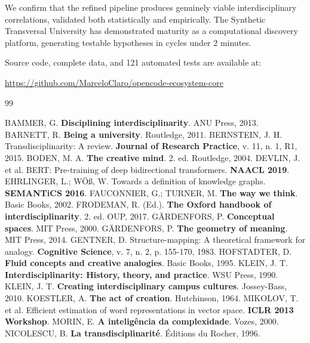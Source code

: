 \documentclass[a4paper,12pt]{article}
\begin{document}
We confirm that the refined pipeline produces genuinely viable interdisciplinary 
correlations, validated both statistically and empirically. The Synthetic Transversal 
University has demonstrated maturity as a computational discovery platform, generating 
testable hypotheses in cycles under 2 minutes.

Source code, complete data, and 121 automated tests are available at:
\begin{center}
\url{https://github.com/MarceloClaro/opencode-ecosystem-core}
\end{center}


\begin{thebibliography}{99}

 BAMMER, G. \textbf{Disciplining interdisciplinarity}. ANU Press, 2013.
 BARNETT, R. \textbf{Being a university}. Routledge, 2011.
 BERNSTEIN, J. H. Transdisciplinarity: A review. \textbf{Journal of Research Practice}, v. 11, n. 1, R1, 2015.
 BODEN, M. A. \textbf{The creative mind}. 2. ed. Routledge, 2004.
 DEVLIN, J. et al. BERT: Pre-training of deep bidirectional transformers. \textbf{NAACL 2019}.
 EHRLINGER, L.; WÖß, W. Towards a definition of knowledge graphs. \textbf{SEMANTiCS 2016}.
 FAUCONNIER, G.; TURNER, M. \textbf{The way we think}. Basic Books, 2002.
 FRODEMAN, R. (Ed.). \textbf{The Oxford handbook of interdisciplinarity}. 2. ed. OUP, 2017.
 GÄRDENFORS, P. \textbf{Conceptual spaces}. MIT Press, 2000.
 GÄRDENFORS, P. \textbf{The geometry of meaning}. MIT Press, 2014.
 GENTNER, D. Structure-mapping: A theoretical framework for analogy. \textbf{Cognitive Science}, v. 7, n. 2, p. 155-170, 1983.
 HOFSTADTER, D. \textbf{Fluid concepts and creative analogies}. Basic Books, 1995.
 KLEIN, J. T. \textbf{Interdisciplinarity: History, theory, and practice}. WSU Press, 1990.
 KLEIN, J. T. \textbf{Creating interdisciplinary campus cultures}. Jossey-Bass, 2010.
 KOESTLER, A. \textbf{The act of creation}. Hutchinson, 1964.
 MIKOLOV, T. et al. Efficient estimation of word representations in vector space. \textbf{ICLR 2013 Workshop}.
 MORIN, E. \textbf{A inteligência da complexidade}. Vozes, 2000.
 NICOLESCU, B. \textbf{La transdisciplinarité}. Éditions du Rocher, 1996.

\end{thebibliography}
\end{document}
